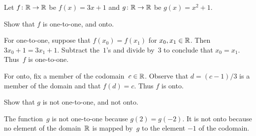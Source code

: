 \documentclass{ibl}  %
\begin{document}
\begin{problem} 
  Let $\mbox{$f\colon \mathbb{R}\to \mathbb{R}$}$ be $f(x)=3x+1$ and 
  $\mbox{$g\colon \mathbb{R}\to \mathbb{R}$}$ be $g(x)=x^2+1$.
\begin{exes}
\begin{exercise} 
  Show that $f$ is one-to-one, and onto.
\end{exercise}
\begin{answer}
  For one-to-one, suppose that $f(x_0)=f(x_1)$ for $x_0,x_1\in\mathbb{R}$.
  Then $3x_0+1=3x_1+1$.
  Subtract the~$1$'s and divide by~$3$ to conclude that $x_0=x_1$.
  Thus~$f$ is one-to-one.   

  For onto, fix a member of the codomain~$c\in\mathbb{R}$.
  Observe that $d=(c-1)/3$ is a member of the domain and that 
  $f(d)=c$.
  Thus $f$ is onto.  
\end{answer}
\begin{exercise} 
  Show that $g$ is not one-to-one, and not onto.
\end{exercise}
\begin{answer}
  The function~$g$ is not one-to-one because $g(2)=g(-2)$.
  It is not onto because no element of the domain~$\mathbb{R}$ is mapped by~$g$
  to the element $-1$ of the codomain.          
\end{answer}
\end{exes}
\end{problem}
\end{document}
